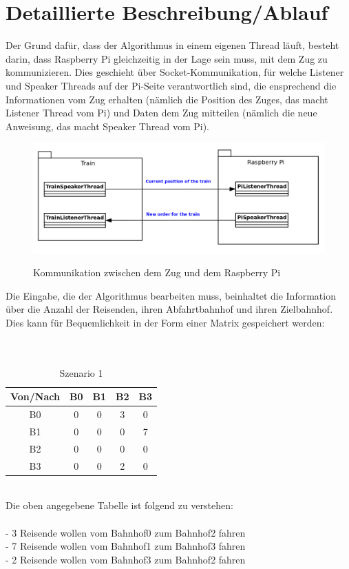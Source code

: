 \section{Detaillierte Beschreibung/Ablauf}
Der Grund dafür, dass der Algorithmus in einem eigenen Thread läuft, besteht darin, dass Raspberry Pi gleichzeitig in der Lage sein muss, mit dem Zug zu kommunizieren. Dies geschieht über Socket-Kommunikation, für welche Listener und Speaker Threads auf der Pi-Seite verantwortlich sind, die ensprechend die Informationen vom Zug erhalten (nämlich die Position des Zuges, das macht Listener Thread vom Pi) und Daten dem Zug mitteilen (nämlich die neue Anweisung, das macht Speaker Thread vom Pi). \\
%
\begin{figure}[H]	
\caption{Kommunikation zwischen dem Zug und dem Raspberry Pi}
\includegraphics[width=2\textwidth, width=470pt]{content/images/communication.png}
\label{pic:communication}
\end{figure}
\noindent
Die Eingabe, die der Algorithmus bearbeiten muss, beinhaltet die Information über die Anzahl der Reisenden, ihren Abfahrtbahnhof und ihren Zielbahnhof. Dies kann für Bequemlichkeit in der Form einer Matrix gespeichert werden:\\
\\
\\
\begin{table}[H]
\caption{Szenario 1}
\center
 \begin{tabular}{|c|c|c|c|c|}
 \hline
  Von/Nach & B0 & B1 & B2 & B3 \\ \hline
  B0 & 0 & 0 & 3 & 0\\   \hline
    B1 & 0 & 0 & 0 & 7 \\   \hline
      B2 & 0 & 0 & 0 & 0\\   \hline
        B3 & 0 & 0 & 2 & 0 \\   \hline
 \end{tabular}
\end{table}
\noindent
\\
Die oben angegebene Tabelle ist folgend zu verstehen:\\
\\
- 3 Reisende wollen vom Bahnhof0 zum Bahnhof2 fahren\\
- 7 Reisende wollen vom Bahnhof1 zum Bahnhof3 fahren\\
- 2 Reisende wollen vom Bahnhof3 zum Bahnhof2 fahren\\

